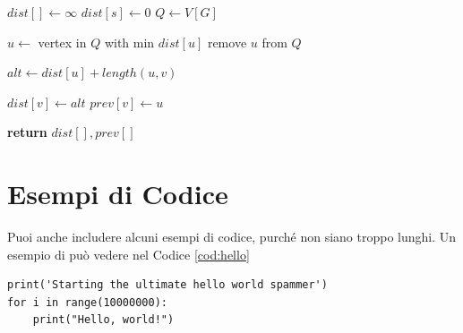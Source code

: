 \begin{algorithm}[H] %
\caption{Dijkstra's Algorithm} %
\label{alg:dijkstra} %

    \begin{algorithmic}[1] %
        
            
            \State $dist[] \gets \infty$ 
            \State $dist[s] \gets 0$     
            \State $Q \gets V[G]$        
            
                \State $u \gets$ vertex in $Q$ with min $dist[u]$
                \State remove $u$ from $Q$
                
                    \State $alt \gets dist[u] + length(u, v)$
                    
                        \State $dist[v] \gets alt$
                        \State $prev[v] \gets u$
                    \EndIf %
                    
                \EndFor %
            \EndWhile %
            
            \State \textbf{return} $dist[], prev[]$
            
        \EndProcedure %
        
    \end{algorithmic}
\end{algorithm}

\section{Esempi di Codice}
Puoi anche includere alcuni esempi di codice, purché non siano troppo lunghi. Un esempio di può vedere nel Codice \ref{cod:hello}
\begin{lstlisting}[caption={Codice di esempio, tratto da helloworldspam.py}, label={cod:hello}]
print('Starting the ultimate hello world spammer')
for i in range(10000000):
    print("Hello, world!")
\end{lstlisting}

